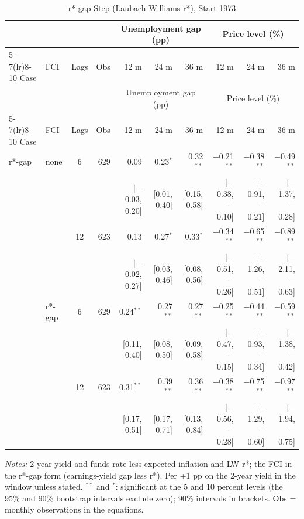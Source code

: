 \begingroup\scriptsize\setlength{\tabcolsep}{0.9pt}
\begin{longtable}{llcrrrrrrr}
\caption{r*-gap Step (Laubach-Williams r*), Start 1973}\label{tab:appF173}\\
\toprule
 & & & & \multicolumn{3}{c}{Unemployment gap (pp)} & \multicolumn{3}{c}{Price level (\%)}\\ \cmidrule(lr){5-7}\cmidrule(lr){8-10}
Case & FCI & Lags & Obs & 12 m & 24 m & 36 m & 12 m & 24 m & 36 m\\
\midrule\endfirsthead
\toprule
 & & & & \multicolumn{3}{c}{Unemployment gap (pp)} & \multicolumn{3}{c}{Price level (\%)}\\ \cmidrule(lr){5-7}\cmidrule(lr){8-10}
Case & FCI & Lags & Obs & 12 m & 24 m & 36 m & 12 m & 24 m & 36 m\\
\midrule\endhead
\bottomrule\endfoot
r*-gap & none & 6 & 629 & 0.09 & 0.23$^{*}$ & 0.32$^{**}$ & $-$0.21$^{**}$ & $-$0.38$^{**}$ & $-$0.49$^{**}$\\
 & & & & {\scriptsize [$-$0.03, 0.20]} & {\scriptsize [0.01, 0.40]} & {\scriptsize [0.15, 0.58]} & {\scriptsize [$-$0.38, $-$0.10]} & {\scriptsize [$-$0.91, $-$0.21]} & {\scriptsize [$-$1.37, $-$0.28]}\\
 &  & 12 & 623 & 0.13 & 0.27$^{*}$ & 0.33$^{*}$ & $-$0.34$^{**}$ & $-$0.65$^{**}$ & $-$0.89$^{**}$\\
 & & & & {\scriptsize [$-$0.02, 0.27]} & {\scriptsize [0.03, 0.46]} & {\scriptsize [0.08, 0.56]} & {\scriptsize [$-$0.51, $-$0.26]} & {\scriptsize [$-$1.26, $-$0.51]} & {\scriptsize [$-$2.11, $-$0.63]}\\
 & r*-gap & 6 & 629 & 0.24$^{**}$ & 0.27$^{**}$ & 0.27$^{**}$ & $-$0.25$^{**}$ & $-$0.44$^{**}$ & $-$0.59$^{**}$\\
 & & & & {\scriptsize [0.11, 0.40]} & {\scriptsize [0.08, 0.50]} & {\scriptsize [0.09, 0.58]} & {\scriptsize [$-$0.47, $-$0.15]} & {\scriptsize [$-$0.93, $-$0.34]} & {\scriptsize [$-$1.38, $-$0.42]}\\
 &  & 12 & 623 & 0.31$^{**}$ & 0.39$^{**}$ & 0.36$^{**}$ & $-$0.38$^{**}$ & $-$0.75$^{**}$ & $-$0.97$^{**}$\\
 & & & & {\scriptsize [0.17, 0.51]} & {\scriptsize [0.17, 0.71]} & {\scriptsize [0.13, 0.84]} & {\scriptsize [$-$0.56, $-$0.28]} & {\scriptsize [$-$1.29, $-$0.60]} & {\scriptsize [$-$1.94, $-$0.75]}\\
\end{longtable}
\begin{flushleft}\footnotesize\textit{Notes:} 2-year yield and funds rate less expected inflation and LW r*; the FCI in the r*-gap form (earnings-yield gap less r*). Per +1 pp on the 2-year yield in the window unless stated. $^{**}$ and $^{*}$: significant at the 5 and 10 percent levels (the 95\% and 90\% bootstrap intervals exclude zero); 90\% intervals in brackets. Obs = monthly observations in the equations.\end{flushleft}
\endgroup
